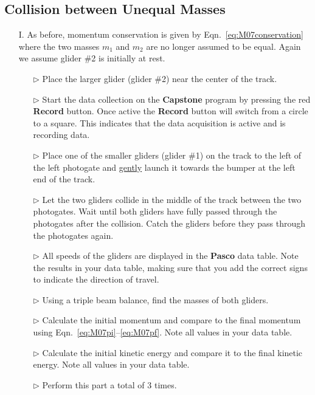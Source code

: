 \subsection{Collision between Unequal Masses}

\begin{itemize}
\item[I.]As before, momentum conservation is given by Eqn.~\ref{eq:M07conservation} where the two masses $m_1$ and $m_2$ are no longer assumed to be equal.  Again we assume glider \#2 is initially at rest.

  \begin{itemize}
  \item[$\triangleright$] Place the larger glider (glider \#2) near the center of the track.
  \item[$\triangleright$] Start the data collection on the \textbf{Capstone} program by pressing the red \textbf{Record} button. Once active the \textbf{Record} button will switch from a circle to a square. This indicates that the data acquisition is active and is recording data.
  \item[$\triangleright$] Place one of the smaller gliders (glider \#1) on the track to the left of the left photogate and \underline{gently} launch it towards the bumper at the left end of the track.
  \item[$\triangleright$] Let the two gliders collide in the middle of the track between the two photogates. Wait until both gliders have fully passed through the photogates after the collision. Catch the gliders before they pass through the photogates again.
  \item[$\triangleright$] All speeds of the gliders are displayed in the \textbf{Pasco} data table. Note the results in your data table, making sure that you add the correct signs to indicate the direction of travel.
  \item[$\triangleright$]Using a triple beam balance, find the masses of both gliders.
  \item[$\triangleright$] Calculate the initial momentum and compare to the final momentum using Eqn.~\ref{eq:M07pi}--\ref{eq:M07pf}. Note all values in your data table.
  \item[$\triangleright$] Calculate the initial kinetic energy and compare it to the final kinetic energy. Note all values in your data table.
  \item[$\triangleright$] Perform this part a total of 3 times.
  \end{itemize}


\end{itemize}

